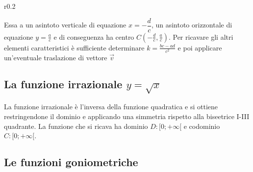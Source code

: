 \documentclass{article}     %
\begin{document}
        \begin{wrapfigure}[10]{r}{0.2\textwidth}
            \begin{center}
            \end{center}
        \end{wrapfigure}
        Essa a un asintoto verticale di equazione $x=-\dfrac{d}{c}$, un asintoto  orizzontale di equazione $y=\frac{a}{c}$ e di conseguenza ha centro $C(-\frac{d}{c},\frac{a}{c})$. Per ricavare gli altri elementi caratteristici è sufficiente determinare $k=\frac{bc-ad}{c^2}$ e poi applicare un'eventuale traslazione di vettore $\vec{v}$
        \subsection{La funzione irrazionale $y=\sqrt{x}$}
        La funzione irrazionale è l'inversa della funzione quadratica e si ottiene restringendone il dominio e applicando una simmetria rispetto alla biseetrice I-III quadrante. La funzione che si ricava ha dominio $D:[0;+\infty[$ e codominio $C:[0;+\infty[$.
    \subsection{Le funzioni goniometriche}
\end{document}
